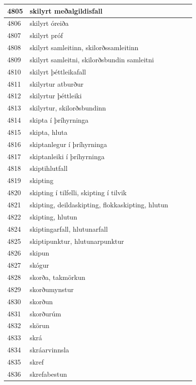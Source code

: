 \begin{longtable}{p{}|p{}|p{}|p{}|p{}}
\hline
4805 & skilyrt meðalgildisfall &  &  &  \\
\hline
4806 & skilyrt óreiða &  &  &  \\
\hline
4807 & skilyrt próf &  &  &  \\
\hline
4808 & skilyrt samleitinn, skilorðssamleitinn &  &  &  \\
\hline
4809 & skilyrt samleitni, skilorðsbundin samleitni &  &  &  \\
\hline
4810 & skilyrt þéttleikafall &  &  &  \\
\hline
4811 & skilyrtur atburður &  &  &  \\
\hline
4812 & skilyrtur þéttleiki &  &  &  \\
\hline
4813 & skilyrtur, skilorðsbundinn &  &  &  \\
\hline
4814 & skipta í þríhyrninga &  &  &  \\
\hline
4815 & skipta, hluta &  &  &  \\
\hline
4816 & skiptanlegur í þríhyrninga &  &  &  \\
\hline
4817 & skiptanleiki í þríhyrninga &  &  &  \\
\hline
4818 & skiptihlutfall &  &  &  \\
\hline
4819 & skipting &  &  &  \\
\hline
4820 & skipting í tilfelli, skipting í tilvik &  &  &  \\
\hline
4821 & skipting, deildaskipting, flokkaskipting, hlutun &  &  &  \\
\hline
4822 & skipting, hlutun &  &  &  \\
\hline
4824 & skiptingarfall, hlutunarfall &  &  &  \\
\hline
4825 & skiptipunktur, hlutunarpunktur &  &  &  \\
\hline
4826 & skipun &  &  &  \\
\hline
4827 & skógur &  &  &  \\
\hline
4828 & skorða, takmörkun &  &  &  \\
\hline
4829 & skorðumynstur &  &  &  \\
\hline
4830 & skorðun &  &  &  \\
\hline
4831 & skorðurúm &  &  &  \\
\hline
4832 & skörun &  &  &  \\
\hline
4833 & skrá &  &  &  \\
\hline
4834 & skráarvinnsla &  &  &  \\
\hline
4835 & skref &  &  &  \\
\hline
4836 & skrefabestun &  &  &  \\

\end{longtable}
